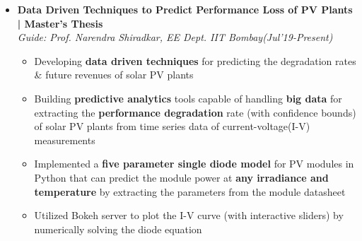 \documentclass[a4paper, 10pt]{article}
\newcommand{\isep}{-2 pt}
\begin{document}
\begin{itemize} \itemsep \isep 
\vspace{-0.05cm}

\item \textbf{\large Data Driven Techniques to Predict Performance Loss of PV Plants | Master's Thesis}\\
 \textit{Guide: Prof. Narendra Shiradkar, EE Dept. IIT Bombay}\hfill{\em{(Jul'19-Present)}}\\
\vspace{2pt}
	\begin{itemize}\itemsep \isep
	\vspace{-0.7cm}
		\item Developing \textbf{data driven techniques} for predicting the degradation rates \& future revenues of solar PV plants
\item Building \textbf{predictive analytics} tools capable of handling \textbf{big data} for extracting the \textbf{performance degradation} rate (with confidence bounds) of solar PV plants from time series data of current-voltage(I-V) measurements
		\item  Implemented a \textbf{five parameter single diode model} for PV modules in Python that can predict the module power at \textbf{any irradiance and temperature} by extracting the parameters from the module datasheet
	\item Utilized Bokeh server to plot the I-V curve (with interactive sliders) by numerically solving the diode equation
    \end{itemize}


\end{itemize}
\end{document}
